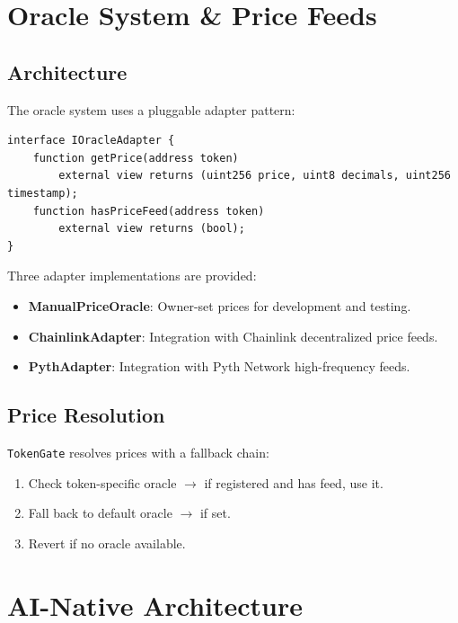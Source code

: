 \documentclass[11pt,a4paper]{article}
\begin{document}
\section{Oracle System \& Price Feeds}
\label{sec:oracle}

\subsection{Architecture}

The oracle system uses a pluggable adapter pattern:

\begin{lstlisting}[style=solidity]
interface IOracleAdapter {
    function getPrice(address token)
        external view returns (uint256 price, uint8 decimals, uint256 timestamp);
    function hasPriceFeed(address token)
        external view returns (bool);
}
\end{lstlisting}

Three adapter implementations are provided:
\begin{itemize}
    \item \textbf{ManualPriceOracle}: Owner-set prices for development and testing.
    \item \textbf{ChainlinkAdapter}: Integration with Chainlink decentralized price feeds.
    \item \textbf{PythAdapter}: Integration with Pyth Network high-frequency feeds.
\end{itemize}

\subsection{Price Resolution}

\texttt{TokenGate} resolves prices with a fallback chain:
\begin{enumerate}
    \item Check token-specific oracle $\to$ if registered and has feed, use it.
    \item Fall back to default oracle $\to$ if set.
    \item Revert if no oracle available.
\end{enumerate}

\section{AI-Native Architecture}
\label{sec:ai}
\end{document}
